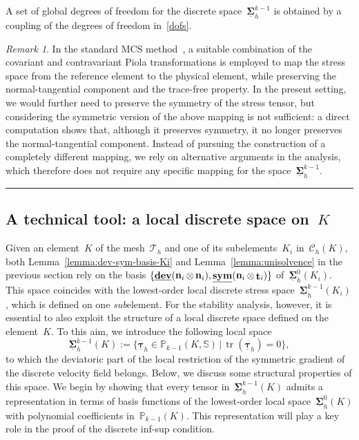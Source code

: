 \documentclass[a4paper,twoside,10pt]{article}
\theoremstyle{plain}
\theoremstyle{remark}
\newtheorem{remark}[theorem]{Remark}
\theoremstyle{definition}
\numberwithin{equation}{section}
\numberwithin{figure}{section}
\newcommand{\eremk}{\hbox{}\hfill\rule{0.8ex}{0.8ex}}
\newcommand{\Pbbkmo}{\mathbb{P}_{k-1}}
\newcommand{\Ccalh}{\mathcal{C}_h}
\newcommand{\Tauh}{\mathcal{T}_h}
\newcommand{\Sbb}{\mathbb{S}}
\newcommand{\K}{K}
\newcommand{\Sigmah}{\underline{\boldsymbol{\Sigma}}_h}
\newcommand{\Sigmahz}{\Sigmah^0}
\newcommand{\Sigmahkmo}{\Sigmah^{k-1}}
\newcommand{\taubfh}{\underline{\boldsymbol{\tau}}_h}
\DeclareMathOperator{\dev}{\underline{\mathbf{dev}}}
\DeclareMathOperator{\tr}{tr}
\newcommand{\sym}{\underline{\bf{sym}}}
\DeclareMathOperator{\norm}{\bf{n}}
\DeclareMathOperator{\tang}{\bf{t}}
\newcommand{\CcalhK}{\Ccalh(\K)}
\newcommand{\Ki}{{\K_i}}
\newcommand{\normi}{\norm_i}
\newcommand{\tangi}{\tang_i}
\begin{document}
A set of global degrees of freedom for the discrete space~$\Sigmahkmo$
is obtained by a coupling of the degrees of freedom in~\eqref{dofs}.

\begin{remark}
In the standard MCS method~\cite{Gopalakrishnan-Lederer-Schoberl:2020-b},
a suitable combination of the covariant and contravariant Piola transformations
is employed to map the stress space from the reference element to the physical element,
while preserving the normal-tangential component
and the trace-free property.
In the present setting,
we would further need to preserve the symmetry of the stress tensor,
but considering the symmetric version of the above mapping is not sufficient:
a direct computation shows that,
although it preserves symmetry,
it no longer preserves the normal-tangential component.
Instead of pursuing the construction of a completely different mapping,
we rely on alternative arguments in the analysis,
which therefore does not require any specific mapping for the space~$\Sigmahkmo$.
\eremk
\end{remark}

\subsection{A technical tool: a local discrete space on~$\K$} \label{subsection:macro-local-space}

Given an element~$\K$ of the mesh~$\Tauh$
and one of its subelements~$\Ki$ in~$\CcalhK$,
both Lemma~\ref{lemma:dev-sym-basis-Ki}
and Lemma~\ref{lemma:unisolvence}
in the previous section
rely on the basis
$\{\dev(\normi\otimes\normi),\sym(\normi\otimes\tangi)\}$
of~$\Sigmahz(\Ki)$.
This space coincides with the lowest-order local discrete stress space~$\Sigmahkmo(\Ki)$,
which is defined on one \emph{sub}element.
For the stability analysis,
however,
it is essential to also exploit the structure of a local discrete space
defined on the element~$\K$.
To this aim,
we introduce the following local space
\begin{equation*}
\Sigmahkmo(K) := \{ \taubfh \in \Pbbkmo(K,\Sbb) \, | \, \tr(\taubfh) = 0 \},
\end{equation*}
to which the deviatoric part of
the local restriction of the symmetric gradient
of the discrete velocity field belongs.
Below,
we discuss some structural properties of this space.
We begin by showing that every tensor in~$\Sigmahkmo(K)$
admits a representation in terms of basis functions of
the lowest-order local space~$\Sigmahz(K)$
with polynomial coefficients in~$\Pbbkmo(K)$.
This representation
will play a key role in the proof of the discrete inf-sup condition.
\end{document}
